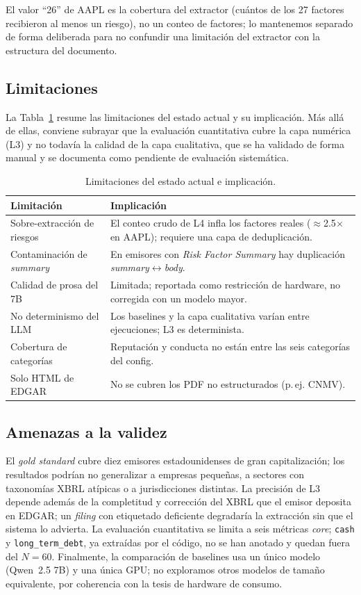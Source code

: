 \documentclass[conference]{IEEEtran}
\begin{document}
El valor ``26'' de AAPL es la cobertura del extractor (cuántos de los 27 factores
recibieron al menos un riesgo), no un conteo de factores; lo mantenemos separado
de forma deliberada para no confundir una limitación del extractor con la
estructura del documento.

\subsection{Limitaciones}
La Tabla~\ref{tab:limits} resume las limitaciones del estado actual y su
implicación. Más allá de ellas, conviene subrayar que la evaluación cuantitativa
cubre la capa numérica (L3) y no todavía la calidad de la capa cualitativa, que
se ha validado de forma manual y se documenta como pendiente de evaluación
sistemática.

\begin{table}[t]
\centering
\caption{Limitaciones del estado actual e implicación.}
\label{tab:limits}
\begin{tabular}{p{}p{}}
\toprule
Limitación & Implicación \\
\midrule
Sobre-extracción de riesgos & El conteo crudo de L4 infla los factores reales
($\approx$2.5$\times$ en AAPL); requiere una capa de deduplicación. \\
Contaminación de \textit{summary} & En emisores con \textit{Risk Factor Summary}
hay duplicación \textit{summary}$\leftrightarrow$\textit{body}. \\
Calidad de prosa del 7B & Limitada; reportada como restricción de hardware, no
corregida con un modelo mayor. \\
No determinismo del LLM & Los baselines y la capa cualitativa varían entre
ejecuciones; L3 es determinista. \\
Cobertura de categorías & Reputación y conducta no están entre las seis
categorías del config. \\
Solo HTML de EDGAR & No se cubren los PDF no estructurados (p.\,ej. CNMV). \\
\bottomrule
\end{tabular}
\end{table}

\subsection{Amenazas a la validez}
El \textit{gold standard} cubre diez emisores estadounidenses de gran
capitalización; los resultados podrían no generalizar a empresas pequeñas, a
sectores con taxonomías XBRL atípicas o a jurisdicciones distintas. La precisión
de L3 depende además de la completitud y corrección del XBRL que el emisor deposita
en EDGAR; un \textit{filing} con etiquetado deficiente degradaría la extracción sin
que el sistema lo advierta. La evaluación cuantitativa se limita a seis métricas
\textit{core}; \texttt{cash} y \texttt{long\_term\_debt}, ya extraídas por el
código, no se han anotado y quedan fuera del $N=60$. Finalmente, la comparación de
baselines usa un único modelo (Qwen~2.5 7B) y una única GPU; no exploramos otros
modelos de tamaño equivalente, por coherencia con la tesis de hardware de consumo.
\end{document}
